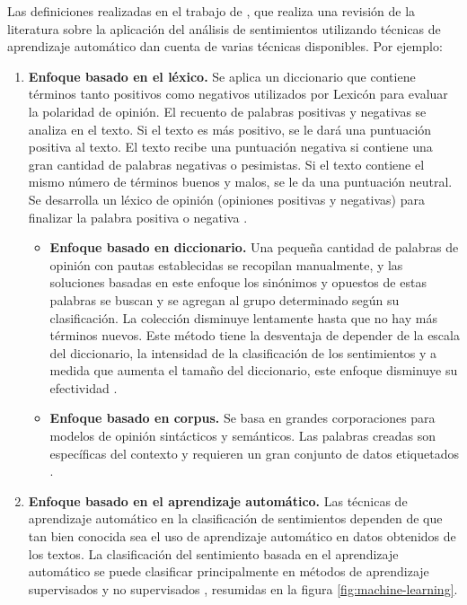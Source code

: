 Las definiciones realizadas en el trabajo  de \citet{anvarliterature}, que realiza una revisión de la literatura sobre la aplicación del análisis de sentimientos utilizando técnicas de aprendizaje automático dan cuenta de varias técnicas disponibles. Por ejemplo:

\begin{enumerate}
\item \textbf{Enfoque basado en el léxico.} Se aplica un diccionario que contiene términos tanto positivos como negativos utilizados por Lexicón para evaluar la polaridad de opinión. El recuento de palabras positivas y negativas se analiza en el texto. Si el texto es más positivo, se le dará una puntuación positiva al texto. El texto recibe una puntuación negativa si contiene una gran cantidad de palabras negativas o pesimistas. Si el texto contiene el mismo número de términos buenos y malos, se le da una puntuación neutral. Se desarrolla un léxico de opinión (opiniones positivas y negativas) para finalizar la palabra positiva o negativa \citep{medhat2014sentiment}.

    \begin{itemize}
        \item \textbf{Enfoque basado en diccionario.}  Una pequeña cantidad de palabras de opinión con pautas establecidas se recopilan manualmente\citep{medhat2014sentiment}, y las soluciones basadas en este enfoque los sinónimos y opuestos de estas palabras se buscan y se agregan al grupo determinado según su clasificación. La colección disminuye lentamente hasta que no hay más términos nuevos. Este método tiene la desventaja de depender de la escala del diccionario, la intensidad de la clasificación de los sentimientos y a medida que aumenta el tamaño del diccionario, este enfoque disminuye su efectividad \citep{jain2016application}.
        
        \item \textbf{Enfoque basado en corpus.} Se basa en grandes corporaciones para modelos de opinión sintácticos y semánticos. Las palabras creadas son específicas del contexto y requieren un gran conjunto de datos etiquetados \citep{jain2016application}.
        
    \end{itemize} 
    
    \item \textbf{Enfoque basado en el aprendizaje automático.} Las técnicas de aprendizaje automático en la clasificación de sentimientos dependen de que tan bien conocida sea el uso de aprendizaje automático en datos obtenidos de los textos. La clasificación del sentimiento basada en el aprendizaje automático se puede clasificar principalmente en métodos de aprendizaje supervisados y no supervisados \citep{aydougan2016comprehensive}, resumidas en la figura \ref{fig:machine-learning}.
    

\end{enumerate}
